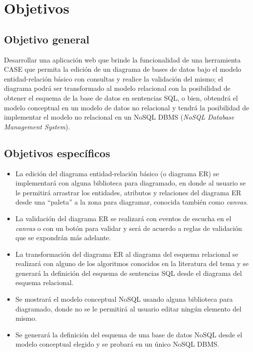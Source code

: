 \section{Objetivos}

\subsection*{Objetivo general}
Desarrollar una aplicación web que brinde la funcionalidad de una herramienta CASE que permita la edición de un diagrama de bases de datos bajo el modelo entidad-relación básico con consultas y realice la validación del mismo; el diagrama podrá ser transformado al modelo relacional con la posibilidad de obtener el esquema de la base de datos en sentencias SQL, o bien, obtendrá el modelo conceptual en un modelo de datos no relacional y tendrá la posibilidad de implementar el modelo no relacional en un NoSQL DBMS (\textit{NoSQL Database Management System}).

\subsection*{Objetivos específicos}\label{sec:objSpecifics}

\begin{itemize}
    \item La edición del diagrama entidad-relación básico (o diagrama ER) se implementará con alguna biblioteca para diagramado, en donde al usuario se le permitirá arrastrar los entidades, atributos y relaciones del diagrama ER desde una ``paleta''  a la zona para diagramar, conocida también como \textit{canvas}.
    \item La validación del diagrama ER se realizará con eventos de escucha en el \textit{canvas} o con un botón para validar y será de acuerdo a reglas de validación que se expondrán más adelante.
    \item La transformación del diagrama ER al diagrama del esquema relacional se realizará con alguno de los algoritmos conocidos en la literatura del tema y se generará la definición del esquema de sentencias SQL desde el diagrama del esquema relacional.
    \item Se mostrará el modelo conceptual NoSQL usando alguna biblioteca para diagramado, donde no se le permitirá al usuario editar ningún elemento del mismo.
    \item Se generará la definición del esquema de una base de datos NoSQL desde el modelo conceptual elegido y se probará en un único NoSQL DBMS.
\end{itemize}
